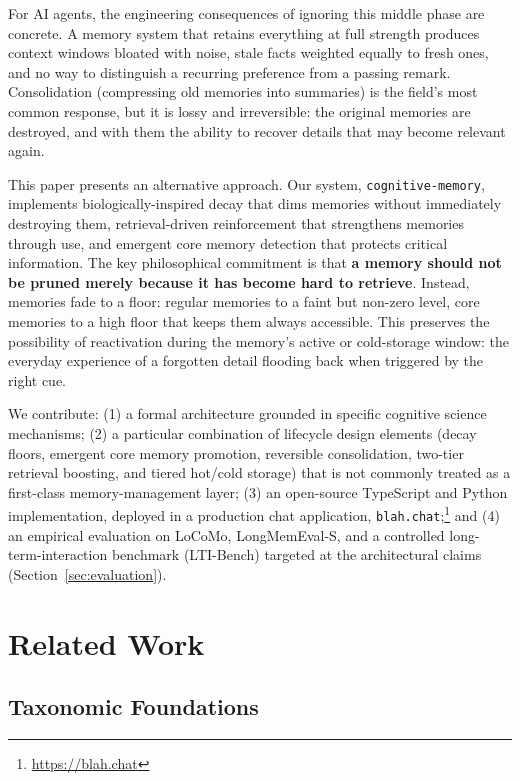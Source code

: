 \documentclass[11pt,a4paper]{article}
\begin{document}
For AI agents, the engineering consequences of ignoring this middle phase are concrete. A memory system that retains everything at full strength produces context windows bloated with noise, stale facts weighted equally to fresh ones, and no way to distinguish a recurring preference from a passing remark. Consolidation (compressing old memories into summaries) is the field's most common response, but it is lossy and irreversible: the original memories are destroyed, and with them the ability to recover details that may become relevant again.

This paper presents an alternative approach. Our system, \texttt{cognitive-memory}, implements biologically-inspired decay that dims memories without immediately destroying them, retrieval-driven reinforcement that strengthens memories through use, and emergent core memory detection that protects critical information. The key philosophical commitment is that \textbf{a memory should not be pruned merely because it has become hard to retrieve}. Instead, memories fade to a floor: regular memories to a faint but non-zero level, core memories to a high floor that keeps them always accessible. This preserves the possibility of reactivation during the memory's active or cold-storage window: the everyday experience of a forgotten detail flooding back when triggered by the right cue.

We contribute: (1) a formal architecture grounded in specific cognitive science mechanisms; (2) a particular combination of lifecycle design elements (decay floors, emergent core memory promotion, reversible consolidation, two-tier retrieval boosting, and tiered hot/cold storage) that is not commonly treated as a first-class memory-management layer; (3) an open-source TypeScript and Python implementation, deployed in a production chat application, \texttt{blah.chat};\footnote{\url{https://blah.chat}} and (4) an empirical evaluation on LoCoMo, LongMemEval-S, and a controlled long-term-interaction benchmark (LTI-Bench) targeted at the architectural claims (Section~\ref{sec:evaluation}).

\section{Related Work}

\subsection{Taxonomic Foundations}
\end{document}
